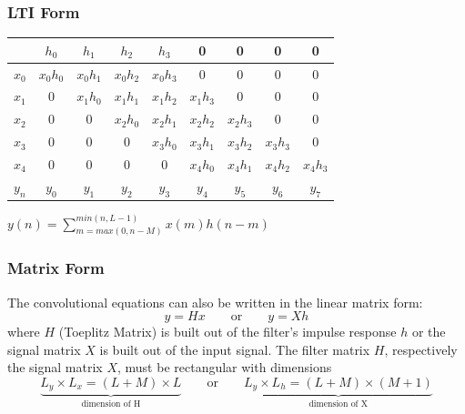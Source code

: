 \subsubsection{LTI Form}
\begin{tabular}{c|c:c:c:c:c:c:c:c|}
	& $h_0$ & $h_1$ & $h_2$ & $h_3$ & 0 & 0 & 0 & 0 \\
	\hline
	$x_0$ & $x_0h_0$ & $x_0h_1$ & $x_0h_2$ & $x_0h_3$ & 0 & 0 & 0 & 0 \\
	$x_1$ & 0 & $x_1h_0$ & $x_1h_1$ & $x_1h_2$ & $x_1h_3$ & 0 & 0 & 0 \\
	$x_2$ & 0 & 0 & $x_2h_0$ & $x_2h_1$ & $x_2h_2$ & $x_2h_3$ & 0 & 0 \\
	$x_3$ & 0 & 0 & 0 & $x_3h_0$ & $x_3h_1$ & $x_3h_2$ & $x_3h_3$ & 0 \\
	$x_4$ & 0 & 0 & 0 & 0 & $x_4h_0$ & $x_4h_1$ & $x_4h_2$ & $x_4h_3$ \\
	\hline\hline
	$y_n$ & $y_0$ & $y_1$ & $y_2$ & $y_3$ & $y_4$ & $y_5$ & $y_6$ & $y_7$ \\
\end{tabular}
\begin{minipage}{6.5cm}
  \hspace{0.5cm} $y(n) = \sum\limits_{m=max(0,n-M)}^{min(n,L-1)} x(m)h(n-m)$
\end{minipage}


\subsubsection{Matrix Form}
The convolutional equations can also be written in the linear matrix form:
\[
	y = H  x	\qquad \text{or} \qquad y = Xh
\]
where $H$ (Toeplitz Matrix) is built out of the filter's impulse response $h$ or the signal matrix $X$ is built 
out of the input signal. The filter matrix $H$, respectively the signal matrix $X$, must be rectangular with dimensions
\[
	\underbrace{L_y \times L_x = (L + M)\times L}_{\text{dimension of H}} \qquad \text{or} \qquad
	\underbrace{L_y \times L_h = (L + M)\times (M + 1)}_{\text{dimension of X}}
\]

